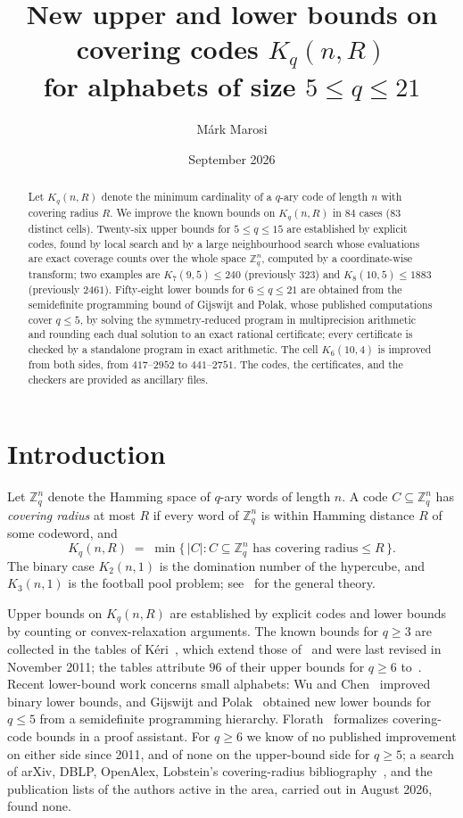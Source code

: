 \documentclass[11pt]{amsart}
\title[New bounds on covering codes for $5\le q\le 21$]{New upper and lower
bounds on covering codes $K_q(n,R)$\\ for alphabets of size $5\le q\le 21$}
\author{M\'ark Marosi}
\date{September 2026}
\newcommand{\Kq}[3]{K_{#1}(#2,#3)}
\newcommand{\Zq}{\mathbb{Z}_q}
\begin{document}
\begin{abstract}
Let $K_q(n,R)$ denote the minimum cardinality of a $q$-ary code of length
$n$ with covering radius $R$. We improve the known bounds on $K_q(n,R)$ in
$84$ cases ($83$ distinct cells). Twenty-six upper bounds for $5\le q\le
15$ are established by explicit codes, found by local search and by a large
neighbourhood search whose evaluations are exact coverage counts over the
whole space $\mathbb{Z}_q^n$, computed by a coordinate-wise transform; two
examples are $\Kq{7}{9}{5}\le 240$ (previously $323$) and
$\Kq{8}{10}{5}\le 1883$ (previously $2461$). Fifty-eight lower bounds for
$6\le q\le 21$ are obtained from the semidefinite programming bound of
Gijswijt and Polak, whose published computations cover $q\le 5$, by solving
the symmetry-reduced program in multiprecision arithmetic and rounding each
dual solution to an exact rational certificate; every certificate is
checked by a standalone program in exact arithmetic. The cell
$\Kq{6}{10}{4}$ is improved from both sides, from $417$--$2952$ to
$441$--$2751$. The codes, the certificates, and the checkers are provided
as ancillary files.
\end{abstract}

\maketitle

\section{Introduction}

Let $\Zq^n$ denote the Hamming space of $q$-ary words of length $n$. A code
$C\subseteq \Zq^n$ has \emph{covering radius} at most $R$ if every word of
$\Zq^n$ is within Hamming distance $R$ of some codeword, and
\[
K_q(n,R) \;=\; \min\{\,|C| : C\subseteq \Zq^n \text{ has covering radius}
\le R\,\}.
\]
The binary case $K_2(n,1)$ is the domination number of the hypercube, and
$K_3(n,1)$ is the football pool problem; see~\cite{CHLL} for the general
theory.

Upper bounds on $K_q(n,R)$ are established by explicit codes and lower
bounds by counting or convex-relaxation arguments. The known bounds for
$q\ge 3$ are collected in the tables of K\'eri~\cite{Keri}, which extend
those of~\cite{CHLL} and were last revised in November 2011; the tables
attribute $96$ of their upper bounds for $q\ge 6$
to~\cite{KeriOstergard2005}. Recent lower-bound work concerns small
alphabets: Wu and Chen~\cite{WuChen} improved binary lower bounds, and
Gijswijt and Polak~\cite{GijswijtPolak} obtained new lower bounds for
$q\le 5$ from a semidefinite programming hierarchy. Florath~\cite{Florath}
formalizes covering-code bounds in a proof assistant. For $q\ge 6$ we know
of no published improvement on either side since 2011, and of none on the
upper-bound side for $q\ge 5$; a search of arXiv, DBLP, OpenAlex,
Lobstein's covering-radius bibliography~\cite{Lobstein}, and the
publication lists of the authors active in the area, carried out in August
2026, found none.
\end{document}
